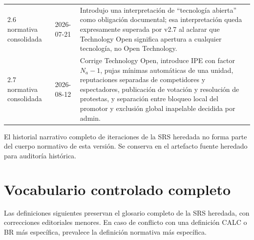 \documentclass[10pt,letterpaper]{article}
\begin{document}
\begin{longtable}{P{2.0cm}P{2.6cm}P{8.8cm}}
2.6 normativa consolidada & 2026-07-21 & Introdujo una interpretación de ``tecnología abierta'' como obligación documental; esa interpretación queda expresamente superada por v2.7 al aclarar que Technology Open significa apertura a cualquier tecnología, no Open Technology.\\
2.7 normativa consolidada & 2026-08-12 & Corrige Technology Open, introduce IPE con factor $N_a-1$, pujas mínimas automáticas de una unidad, reputaciones separadas de competidores y espectadores, publicación de votación y resolución de protestas, y separación entre bloqueo local del promotor y exclusión global inapelable decidida por admin.\\
\bottomrule
\end{longtable}

El historial narrativo completo de iteraciones de la SRS heredada no forma parte del cuerpo normativo de esta versión. Se conserva en el artefacto fuente heredado para auditoría histórica.

\appendix
\section{Vocabulario controlado completo}
Las definiciones siguientes preservan el glosario completo de la SRS heredada, con correcciones editoriales menores. En caso de conflicto con una definición CALC o BR más específica, prevalece la definición normativa más específica.
\end{document}
